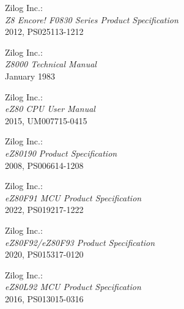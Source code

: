  Zilog Inc.: \\
               {\em Z8 Encore! F0830 Series Product Specification\/} \\
               2012, PS025113-1212

 Zilog Inc.: \\
               {\em Z8000 Technical Manual\/} \\
               January 1983

 Zilog Inc.: \\
               {\em eZ80 CPU User Manual\/} \\
               2015, UM007715-0415

 Zilog Inc.: \\
               {\em eZ80190 Product Specification\/} \\
               2008, PS006614-1208

 Zilog Inc.: \\
               {\em eZ80F91 MCU Product Specification\/} \\
               2022, PS019217-1222

 Zilog Inc.: \\
               {\em eZ80F92/eZ80F93 Product Specification\/} \\
               2020, PS015317-0120

 Zilog Inc.: \\
               {\em eZ80L92 MCU Product Specification\/} \\
               2016, PS013015-0316
